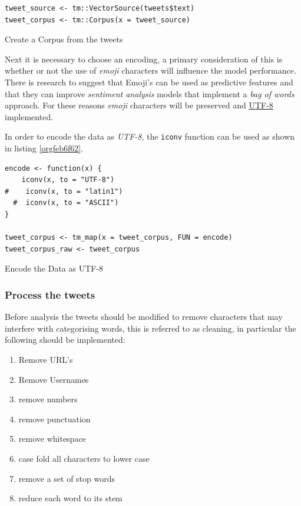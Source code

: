 \documentclass[11pt]{article}
\begin{document}
\begin{listing}[htbp]
\begin{verbatim}
tweet_source <- tm::VectorSource(tweets$text)
tweet_corpus <- tm::Corpus(x = tweet_source)
\end{verbatim}
\caption{\label{org565de53}Create a Corpus from the tweets}
\end{listing}

Next it is necessary to choose an encoding, a primary consideration of this is whether or not the use of \emph{emoji} characters will influence the model performance. There is research to suggest that Emoji's can be used as predictive features \cite{lecompte2017} and that they can improve \emph{sentiment analysis} models \cite{shiha2017} that implement a \emph{bag of words} approach. For these reasons \emph{emoji} characters will be preserved and \href{http://www.utf-8.com/}{UTF-8} implemented.

In order to encode the data as \emph{UTF-8}, the \texttt{iconv} function can be used as shown in listing \ref{orgfeb6f62}.

\begin{listing}[htbp]
\begin{verbatim}
encode <- function(x) {
    iconv(x, to = "UTF-8")
#    iconv(x, to = "latin1")
  #  iconv(x, to = "ASCII")
}

tweet_corpus <- tm_map(x = tweet_corpus, FUN = encode)
tweet_corpus_raw <- tweet_corpus
\end{verbatim}
\caption{\label{orgfeb6f62}Encode the Data as UTF-8}
\end{listing}

\subsubsection{Process the tweets}
\label{sec:orgd83bf66}
Before analysis the tweets should be modified to remove characters that may interfere with categorising words, this is referred to as cleaning, in particular the following should be implemented:

\begin{enumerate}
\item Remove URL's
\item Remove Usernames
\item remove numbers
\item remove punctuation
\item remove whitespace
\item case fold all characters to lower case
\item remove a set of stop words
\item reduce each word to its stem
\end{enumerate}
\end{document}
